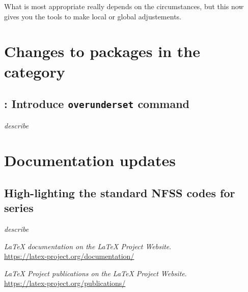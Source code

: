 \documentclass{ltnews}
\begin{document}
What is most appropriate really depends on the circumstances, but this
now gives you the tools to make local or global adjustements.


        
\section{Changes to packages in the  category}

\subsection{: Introduce \texttt{overunderset} command}

\emph{describe}



\section{Documentation updates}

\subsection{High-lighting the standard NFSS codes for series}
      
\emph{describe}


\begin{thebibliography}{9}
  
  \emph{\LaTeX{} documentation on the \LaTeX{} Project Website}.\\  
  \url{https://latex-project.org/documentation/}

  \emph{\LaTeX{} Project publications on the \LaTeX{} Project Website}.\\
  \url{https://latex-project.org/publications/}

\end{thebibliography}
\end{document}

